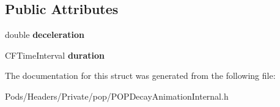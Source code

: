\subsection*{Public Attributes}
\begin{DoxyCompactItemize}
\item 
\mbox{\label{struct___p_o_p_decay_animation_state_a55720819daebb60943a0897a322af594}} 
double {\bfseries deceleration}
\item 
\mbox{\label{struct___p_o_p_decay_animation_state_aa3939f40e0f109bbd77e4662de32dba3}} 
C\+F\+Time\+Interval {\bfseries duration}
\end{DoxyCompactItemize}


The documentation for this struct was generated from the following file\+:\begin{DoxyCompactItemize}
\item 
Pods/\+Headers/\+Private/pop/P\+O\+P\+Decay\+Animation\+Internal.\+h\end{DoxyCompactItemize}
